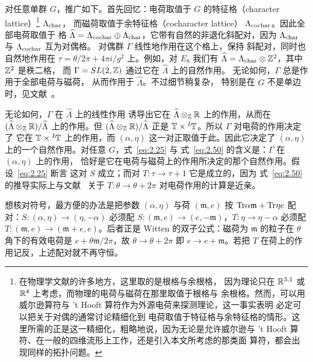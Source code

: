 对任意单群 $G$，推广如下。首先回忆：电荷取值于
$G$ 的特征格（character lattice）\footnote{在物理学文献的许多地方，这里取的是根格与余根格，
因为理论只在 $\R^{3,1}$ 或 $\R^4$ 上考虑，而物理的电荷与磁荷在那里取值于根格与
余根格。然而，可以用威尔逊算符与 't Hooft 算符作为外源电荷来探测理论，这一事实表明
必定可以把关于对偶的通常讨论精细化到
电荷取值于特征格与余特征格的情形。这里所需的正是这一精细化，粗略地说，因为无论是允许威尔逊与 't Hooft
算符、在一般的四维流形上工作，还是引入本文所考虑的那类面
算符，都会出现同样的拓扑问题。 } $\Lambda_{\rm char}$，
而磁荷取值于余特征格（cocharacter lattice）
$\Lambda_{\rm cochar}$。因此全部电荷取值于
格 $\hat\Lambda=\Lambda_{\rm cochar}\oplus \Lambda_{\rm
char}$，它带有自然的非退化斜配对，因为
$\Lambda_{\rm char}$ 与 $\Lambda_{\rm cochar}$ 互为对偶格。
对偶群 $\Gamma$ 线性地作用在这个格上，保持
斜配对，同时也自然地作用在 $\tau=\theta/2\pi
+4\pi i/g^2$ 上。例如，对 $E_8$ 我们有
$\hat\Lambda=\Lambda_{\rm char}\otimes \Z^2$，其中 $\Z^2$ 是秩二格，
而 $\Gamma=SL(2,\Z)$ 通过它在 $\hat\Lambda$ 上的自然作用。
无论如何，$\Gamma$ 总是作用于全部电荷与磁荷，
从而作用于 $\hat\Lambda$。不过细节稍复杂，
特别是在 $G$ 不是单边时，见文献~\cite{ref41,ref42}。

无论如何，$\Gamma$ 在 $\hat\Lambda$ 上的线性作用
诱导出它在 $\hat\Lambda\otimes_\Z\R$ 上的作用，从而在
$(\hat\Lambda\otimes_\Z\R)/\hat\Lambda$ 上的作用。但
$(\hat\Lambda\otimes_\Z\R)/\hat\Lambda$ 正是 $\TT\times
{}^L\neg\TT$。所以 $\Gamma$ 对电荷的作用决定了
它在 $\TT\times {}^L\neg\TT$ 上的作用，而
$(\alpha,\eta)$ 这一对正取值于此。因此它决定了
$(\alpha,\eta)$ 上的一个自然作用。对任意 $G$，式~\eqref{eq:2.25} 与
式~\eqref{eq:2.50} 的含义是：$\Gamma$ 在 $(\alpha,\eta)$ 上的作用，
恰好是它在电荷与磁荷上的作用所决定的那个自然作用。假设~\eqref{eq:2.25} 断言
这对 $S$ 成立；而对 $T:\tau\to\tau+1$ 它是成立的，因为
式~\eqref{eq:2.50} 的推导实际上与文献~\cite{ref46} 关于
$T:\theta\to\theta+2\pi$ 对电荷作用的计算是近亲。

\begin{yizhu}[易错点]
想核对符号，最方便的办法是把参数 $(\alpha,\eta)$ 与荷 $({\mathfrak m},e)$ 按 $\Tr\alpha{\mathfrak m}+\Tr\eta e$ 配对：$S:(\alpha,\eta)\to(\eta,-\alpha)$ 必须配 $S:({\mathfrak m},e)\to(e,-{\mathfrak m})$，$T:\eta\to\eta-\alpha$ 必须配 $T:({\mathfrak m},e)\to({\mathfrak m}+e,e)$。后者正是 Witten 的双子公式：磁荷为 ${\mathfrak m}$ 的粒子在 $\theta$ 角下的有效电荷是 $e+\theta{\mathfrak m}/2\pi$，故 $\theta\to\theta+2\pi$ 即 $e\to e+{\mathfrak m}$。若把 $T$ 在荷上的作用记反，上述配对就不再守恒。
\end{yizhu}

